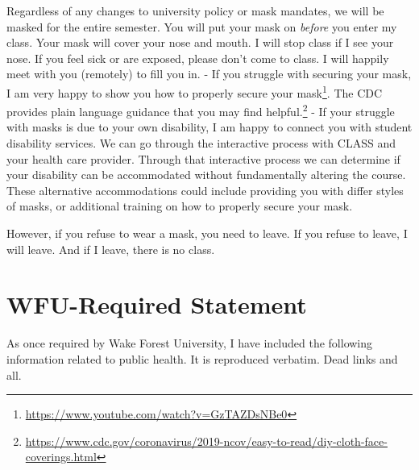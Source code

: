 Regardless of any changes to university policy or mask mandates, we will be masked for the entire semester. You will put your mask on \emph{before} you enter my class. Your mask will cover your nose and mouth. I will stop class if I see your nose.
If you feel sick or are exposed, please don't come to class. I will happily meet with you (remotely) to fill you in.
- If you struggle with securing your mask, I am very happy to show you how to properly secure your mask\footnote{\url{https://www.youtube.com/watch?v=GzTAZDsNBe0}}. The CDC provides plain language guidance that you may find helpful.\footnote{\url{https://www.cdc.gov/coronavirus/2019-ncov/easy-to-read/diy-cloth-face-coverings.html}}
- If your struggle with masks is due to your own disability, I am happy to connect you with student disability services. We can go through the interactive process with CLASS and your health care provider. Through that interactive process we can determine if your disability can be accommodated without fundamentally altering the course. These alternative accommodations could include providing you with differ styles of masks, or additional training on how to properly secure your mask.

However, if you refuse to wear a mask, you need to leave. If you refuse to leave, I will leave. And if I leave, there is no class.

\hypertarget{wfu-required-statement}{%
\section{WFU-Required Statement}\label{wfu-required-statement}}

As once required by Wake Forest University, I have included the following information related to public health. It is reproduced verbatim. Dead links and all.

